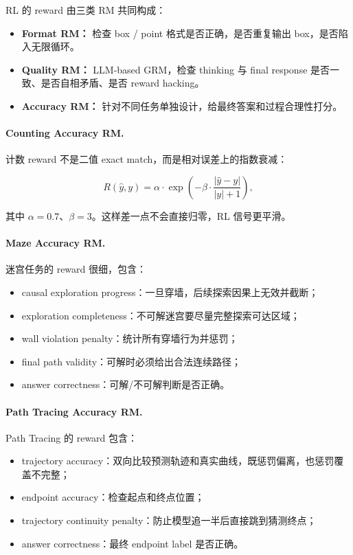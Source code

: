 RL 的 reward 由三类 RM 共同构成：

\begin{itemize}[leftmargin=1.5em]
  \item \textbf{Format RM：} 检查 box / point 格式是否正确，是否重复输出 box，是否陷入无限循环。
  \item \textbf{Quality RM：} LLM-based GRM，检查 thinking 与 final response 是否一致、是否自相矛盾、是否 reward hacking。
  \item \textbf{Accuracy RM：} 针对不同任务单独设计，给最终答案和过程合理性打分。
\end{itemize}

\paragraph{Counting Accuracy RM.}

计数 reward 不是二值 exact match，而是相对误差上的指数衰减：

\[
R(\hat{y},y)=\alpha\cdot\exp\left(-\beta\cdot\frac{|\hat{y}-y|}{|y|+1}\right),
\]

其中 $\alpha=0.7$、$\beta=3$。这样差一点不会直接归零，RL 信号更平滑。

\paragraph{Maze Accuracy RM.}

迷宫任务的 reward 很细，包含：

\begin{itemize}[leftmargin=1.5em]
  \item causal exploration progress：一旦穿墙，后续探索因果上无效并截断；
  \item exploration completeness：不可解迷宫要尽量完整探索可达区域；
  \item wall violation penalty：统计所有穿墙行为并惩罚；
  \item final path validity：可解时必须给出合法连续路径；
  \item answer correctness：可解/不可解判断是否正确。
\end{itemize}

\paragraph{Path Tracing Accuracy RM.}

Path Tracing 的 reward 包含：

\begin{itemize}[leftmargin=1.5em]
  \item trajectory accuracy：双向比较预测轨迹和真实曲线，既惩罚偏离，也惩罚覆盖不完整；
  \item endpoint accuracy：检查起点和终点位置；
  \item trajectory continuity penalty：防止模型追一半后直接跳到猜测终点；
  \item answer correctness：最终 endpoint label 是否正确。
\end{itemize}

